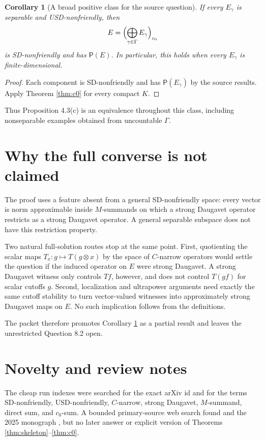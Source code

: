 \documentclass[11pt]{article}
\newtheorem{corollary}{Corollary}
\begin{document}
\begin{corollary}[A broad positive class for the source question]
\label{cor:usd}
If every \(E_\gamma\) is separable and USD-nonfriendly, then
\[
 E=\Bigl(\bigoplus_{\gamma\in\Gamma}E_\gamma\Bigr)_{c_0}
\]
is SD-nonfriendly and has \(\mathsf P(E)\).  In particular, this holds when
every \(E_\gamma\) is finite-dimensional.
\end{corollary}

\begin{proof}
Each component is SD-nonfriendly and has \(\mathsf P(E_\gamma)\) by the
source results.  Apply Theorem \ref{thm:c0} for every compact \(K\).
\end{proof}

Thus Proposition 4.3(c) is an equivalence throughout this class, including
nonseparable examples obtained from uncountable \(\Gamma\).

\section*{Why the full converse is not claimed}

The proof uses a feature absent from a general SD-nonfriendly space: every
vector is norm approximable inside \(M\)-summands on which a strong Daugavet
operator restricts as a strong Daugavet operator.  A general separable
subspace does not have this restriction property.

Two natural full-solution routes stop at the same point.  First, quotienting
the scalar maps \(T_x:g\mapsto T(g\otimes x)\) by the space of \(C\)-narrow
operators would settle the question if the induced operator on \(E\) were
strong Daugavet.  A strong Daugavet witness only controls \(Tf\), however,
and does not control \(T(gf)\) for scalar cutoffs \(g\).  Second, localization
and ultrapower arguments need exactly the same cutoff stability to turn
vector-valued witnesses into approximately strong Daugavet maps on \(E\).
No such implication follows from the definitions.

The packet therefore promotes Corollary \ref{cor:usd} as a partial result and
leaves the unrestricted Question 8.2 open.

\section*{Novelty and review notes}

The cheap run indexes were searched for the exact arXiv id and for the terms
SD-nonfriendly, USD-nonfriendly, \(C\)-narrow, strong Daugavet,
\(M\)-summand, direct sum, and \(c_0\)-sum.  A bounded primary-source web
search found \cite{BKSSW} and the 2025 monograph \cite{KMRW}, but no later
answer or explicit version of Theorems \ref{thm:skeleton}--\ref{thm:c0}.
\end{document}
